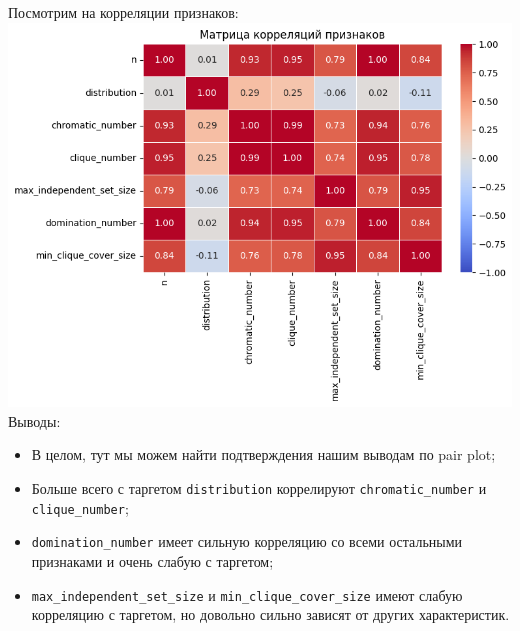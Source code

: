 \documentclass[12pt,a4paper]{report}
\begin{document}
Посмотрим на корреляции признаков:\\
\includegraphics[width=1\linewidth]{img/corr-exp-lnorm.png}
Выводы:
\begin{itemize}
    \item В целом, тут мы можем найти подтверждения нашим выводам по pair plot;
    \item Больше всего с таргетом \texttt{distribution} коррелируют \texttt{chromatic\_number} и \texttt{clique\_number};
    \item \texttt{domination\_number} имеет сильную корреляцию со всеми остальными признаками и очень слабую с таргетом;
    \item \texttt{max\_independent\_set\_size} и \texttt{min\_clique\_cover\_size} имеют слабую корреляцию с таргетом, но довольно сильно зависят от других характеристик.
\end{itemize}
\end{document}
